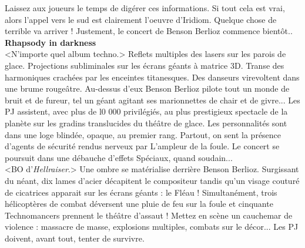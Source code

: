 \documentclass[11pt,twoside,a4paper]{book}
\begin{document}
Laissez aux joueurs le temps de dig{\'e}rer ces informations. Si tout cela est vrai, alors l'appel vers le sud est clairement l'oeuvre d'Iridiom. Quelque chose de terrible va arriver ! Justement, le concert de Benson Berlioz commence bient{\^o}t..~\\

\textbf{\large Rhapsody in darkness}~\\

<N'importe quel album techno.> Reflets multiples des lasers sur les parois de glace. Projections subliminales sur les {\'e}crans g{\'e}ants {\`a} matrice 3D. Transe des harmoniques crach{\'e}es par les enceintes titanesques. Des danseurs virevoltent dans une brume rouge{\^a}tre. Au-dessus d'eux Benson Berlioz pilote tout un monde de bruit et de fureur, tel un g{\'e}ant agitant ses marionnettes de chair et de givre... Les PJ assistent, avec plus de l0 000 privil{\'e}gi{\'e}s, au plus prestigieux spectacle de la plan{\`e}te sur les gradins translucides du th{\'e}{\^a}tre de glace. Les personnalit{\'e}s sont dans une loge blind{\'e}e, opaque, au premier rang. Partout, on sent la pr{\'e}sence d'agents de s{\'e}curit{\'e} rendus nerveux par L'ampleur de la foule. Le concert se poursuit dans une d{\'e}bauche d'effets Sp{\'e}ciaux, quand soudain...~\\

<BO d'\emph{Hellraiser}.> Une ombre se mat{\'e}rialise derri{\`e}re Benson Berlioz. Surgissant du n{\'e}ant, dix lames d'acier d{\'e}capitent le compositeur tandis qu'un visage coutur{\'e} de cicatrices apparait sur les {\'e}crans g{\'e}ants : le Fl{\'e}au ! Simultan{\'e}ment, trois h{\'e}licopt{\`e}res de combat d{\'e}versent une pluie de feu sur la foule et cinquante Technomancers prennent le th{\'e}{\^a}tre d'assaut ! Mettez en sc{\`e}ne un cauchemar de violence : massacre de masse, explosions multiples, combats sur le d{\'e}cor... Les PJ doivent, avant tout, tenter de survivre.~\\
\end{document}
